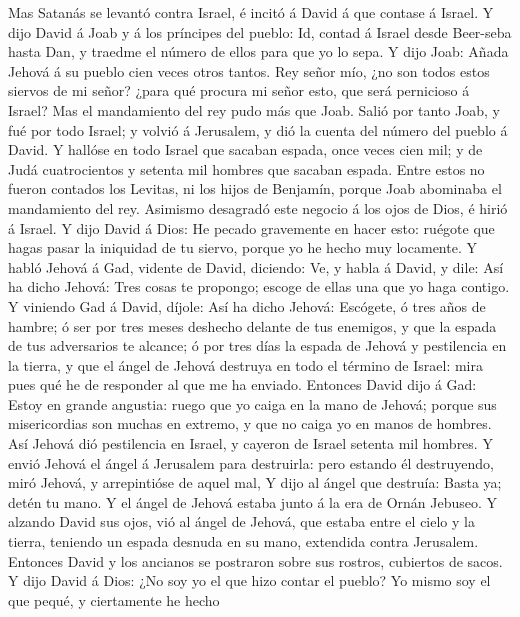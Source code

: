  Mas Satanás se levantó contra Israel, é incitó á David á
que contase á Israel.  Y dijo David á Joab y á los príncipes
del pueblo: Id, contad á Israel desde Beer-seba hasta Dan, y traedme el
número de ellos para que yo lo sepa.  Y dijo Joab: Añada
Jehová á su pueblo cien veces otros tantos. Rey señor mío, ¿no son todos
estos siervos de mi señor? ¿para qué procura mi señor esto, que será
pernicioso á Israel?  Mas el mandamiento del rey pudo más
que Joab. Salió por tanto Joab, y fué por todo Israel; y volvió á
Jerusalem, y dió la cuenta del número del pueblo á David.  Y
hallóse en todo Israel que sacaban espada, once veces cien mil; y de
Judá cuatrocientos y setenta mil hombres que sacaban espada.
 Entre estos no fueron contados los Levitas, ni los hijos de
Benjamín, porque Joab abominaba el mandamiento del rey. 
Asimismo desagradó este negocio á los ojos de Dios, é hirió á Israel.
 Y dijo David á Dios: He pecado gravemente en hacer esto:
ruégote que hagas pasar la iniquidad de tu siervo, porque yo he hecho
muy locamente.  Y habló Jehová á Gad, vidente de David,
diciendo:  Ve, y habla á David, y dile: Así ha dicho
Jehová: Tres cosas te propongo; escoge de ellas una que yo haga contigo.
 Y viniendo Gad á David, díjole: Así ha dicho Jehová:
 Escógete, ó tres años de hambre; ó ser por tres meses
deshecho delante de tus enemigos, y que la espada de tus adversarios te
alcance; ó por tres días la espada de Jehová y pestilencia en la tierra,
y que el ángel de Jehová destruya en todo el término de Israel: mira
pues qué he de responder al que me ha enviado.  Entonces
David dijo á Gad: Estoy en grande angustia: ruego que yo caiga en la
mano de Jehová; porque sus misericordias son muchas en extremo, y que no
caiga yo en manos de hombres.  Así Jehová dió pestilencia
en Israel, y cayeron de Israel setenta mil hombres.  Y
envió Jehová el ángel á Jerusalem para destruirla: pero estando él
destruyendo, miró Jehová, y arrepintióse de aquel mal,  Y
dijo al ángel que destruía: Basta ya; detén tu mano. Y el ángel de
Jehová estaba junto á la era de Ornán Jebuseo.  Y alzando
David sus ojos, vió al ángel de Jehová, que estaba entre el cielo y la
tierra, teniendo un espada desnuda en su mano, extendida contra
Jerusalem. Entonces David y los ancianos se postraron sobre sus rostros,
cubiertos de sacos.  Y dijo David á Dios: ¿No soy yo el que
hizo contar el pueblo? Yo mismo soy el que pequé, y ciertamente he hecho

